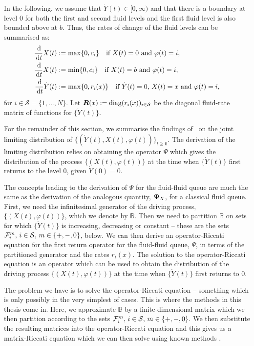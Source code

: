 In the following, we assume that $\dot Y(t) \in [0,\infty)$ and that there is a boundary at level $0$ for both the first and second fluid levels and the first fluid level is also bounded above at \(b\). Thus, the rates of change of the fluid levels can be summarised as:
% 
	\begin{align*} 
		\frac{\, \mathrm{d}}{\, \mathrm{d} t}  X(t) & := \max\{0, c_i\} \quad \mbox{if }  X(t) = 0 \mbox{ and } \varphi(t) = i, \\
		\frac{\, \mathrm{d}}{\, \mathrm{d} t}  X(t) & := \min\{0, c_i\} \quad \mbox{if }  X(t) = b \mbox{ and } \varphi(t) = i, \\
          	\frac{\, \mathrm{d}}{\, \mathrm{d} t} \dot Y(t) & := \max\{0, r_i(x)\} \quad \mbox{if } \dot Y(t) = 0,\, X(t) = x \mbox{ and } \varphi(t) = i, 	
	\end{align*} 
for $i \in \mathcal{S} = \{1,...,N\}$. Let $\boldsymbol R(x) := \mathrm{diag}(r_i(x))_{i \in \mathcal{S}}$ be the diagonal fluid-rate matrix of functions for $\{\dot Y(t)\}$. 

For the remainder of this section, we summarise the findings of~\cite{bo2014} on the joint limiting distribution of $\{( \dot Y(t), X(t), \varphi(t))\}_{t \geq 0}$. The derivation of the limiting distribution relies on obtaining the operator \(\mathbb \Psi\) which gives the distribution of the process \(\{(X(t),\varphi(t))\}\) at the time when \(\{\dot Y(t)\}\) first returns to the level 0, given \(\dot Y(0)=0\).

The concepts leading to the derivation of \( {\mathbb \Psi}\) for the fluid-fluid queue are much the same as the derivation of the analogous quantity, \(\boldsymbol\Psi_X\), for a classical fluid queue. First, we need the infinitesimal generator of the driving process, \(\{(X(t),\varphi(t))\}\), which we denote by \(\mathbb B\). Then we need to partition \(\mathbb B\) on sets for which \(\{\dot Y(t)\}\) is increasing, decreasing or constant -- these are the sets \(\mathcal F_i^m,\, i\in\mathcal{S},\,m\in\{+,-,0\}\), below. We can then derive an operator-Riccati equation for the first return operator for the fluid-fluid queue, \(\mathbb \Psi\), in terms of the partitioned generator and the rates \(r_i(x)\). The solution to the operator-Riccati equation is an operator which can be used to obtain the distribution of the driving process \(\{(X(t),\varphi(t))\}\) at the time when \(\{\dot Y(t)\}\) first returns to \(0\). 

The problem we have is to solve the operator-Riccati equation -- something which is only possibly in the very simplest of cases. This is where the methods in this thesis come in. Here, we approximate \(\mathbb B\) by a finite-dimensional matrix which we then partition according to the sets \(\mathcal F_i^m,\, i\in\mathcal{S},\,m\in\{+,-,0\}\). We then substitute the resulting matrices into the operator-Riccati equation and this gives us a matrix-Riccati equation which we can then solve using known methods \citep{bot08}. 

